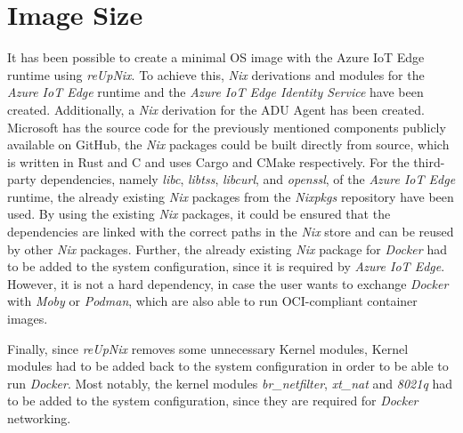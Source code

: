 
\section{Image Size}
It has been possible to create a minimal \ac{OS} image with the Azure IoT Edge runtime
using \textit{reUpNix}. To achieve this, \textit{Nix} derivations and modules for 
the \textit{Azure IoT Edge} runtime and the \textit{Azure IoT Edge Identity Service} 
have been created. Additionally, a \textit{Nix} derivation for the \ac{ADU} Agent has been created.
Microsoft has the source code for the previously mentioned components
publicly available on GitHub, the \textit{Nix} packages could be built directly
from source, which is written in Rust and C and uses Cargo and CMake respectively.
For the third-party dependencies, namely \textit{libc}, \textit{libtss}, \textit{libcurl}, and
\textit{openssl}, of the \textit{Azure IoT Edge} runtime, the already existing \textit{Nix} packages 
from the \textit{Nixpkgs} repository have been used.
By using the existing \textit{Nix} packages, it could be ensured that the dependencies
are linked with the correct paths in the \textit{Nix} store and can be reused
by other \textit{Nix} packages.
Further, the already existing \textit{Nix} package for \textit{Docker} had to be added
to the system configuration, since it is required by \textit{Azure IoT Edge}.
However, it is not a hard dependency, in case the user wants to exchange \textit{Docker}
with \textit{Moby} or \textit{Podman}, which are also able to run \ac{OCI}-compliant
container images.

Finally, since \textit{reUpNix} removes some unnecessary
Kernel modules, Kernel modules had to be added back to the system configuration in order
to be able to run \textit{Docker}.
Most notably, the kernel modules
\textit{br\_netfilter}, \textit{xt\_nat} and \textit{8021q} had to be added to the system configuration,
since they are required for \textit{Docker} networking.

